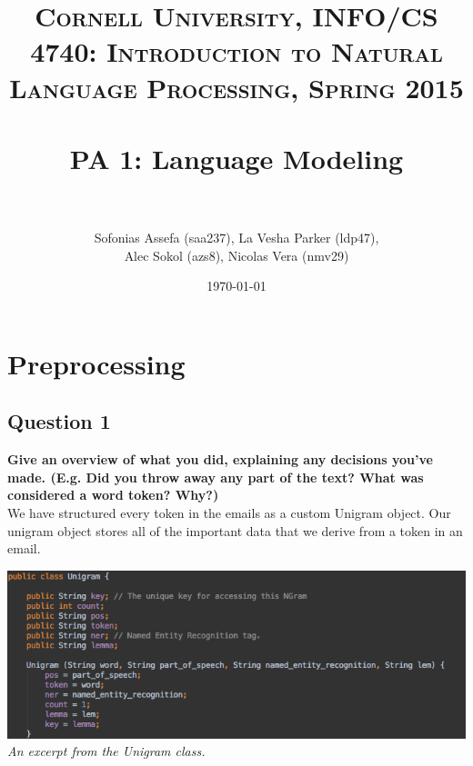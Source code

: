 \documentclass{article} %
\title{	
\normalfont \normalsize 
\textsc{Cornell University, INFO/CS 4740: Introduction to Natural Language Processing, Spring 2015} \\
\horrule{0.5pt} \\[0.4cm] %
\huge PA 1: Language Modeling \\ %
\horrule{2pt} \\[0.5cm] %
}
\author{Sofonias Assefa (saa237), La Vesha Parker (ldp47),\\
Alec Sokol (azs8), Nicolas Vera (nmv29)}
\date{\normalsize\today} %
\begin{document}
\maketitle %

\section{Preprocessing}
\subsection*{Question 1}

\textbf{Give an overview of what you did, explaining any decisions you've made. (E.g. Did you throw away any part of the text? What was considered a word token? Why?)}
\\

We have structured every token in the emails as a custom Unigram object. Our unigram object stores all of the important data that we derive from a token in an email.\\
\begin{center}
\includegraphics[width=1.0\textwidth]{images/unigram.png}
\textit{An excerpt from the Unigram class.}
\end{center}
\end{document}
